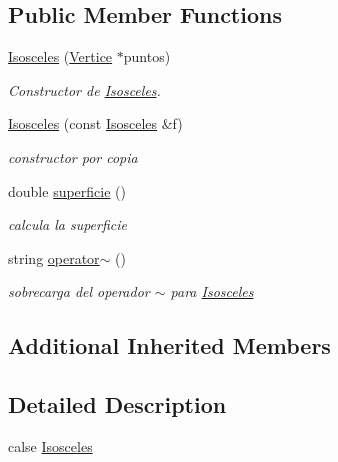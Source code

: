 \subsection*{Public Member Functions}
\begin{DoxyCompactItemize}
\item 
\hyperlink{class_isosceles_a5dc812e7ac02a71016cdc2175176608a}{Isosceles} (\hyperlink{class_vertice}{Vertice} $\ast$puntos)
\begin{DoxyCompactList}\small\item\em Constructor de \hyperlink{class_isosceles}{Isosceles}. \end{DoxyCompactList}\item 
\hyperlink{class_isosceles_a7190cc477e9835205f3061633f73825f}{Isosceles} (const \hyperlink{class_isosceles}{Isosceles} \&f)
\begin{DoxyCompactList}\small\item\em constructor por copia \end{DoxyCompactList}\item 
\mbox{\label{class_isosceles_aa09c863c5ef3620e9c57b09ee380d3d1}} 
double \hyperlink{class_isosceles_aa09c863c5ef3620e9c57b09ee380d3d1}{superficie} ()
\begin{DoxyCompactList}\small\item\em calcula la superficie \end{DoxyCompactList}\item 
\mbox{\label{class_isosceles_a8998981f4d303e909964dfe90f77f445}} 
string \hyperlink{class_isosceles_a8998981f4d303e909964dfe90f77f445}{operator$\sim$} ()
\begin{DoxyCompactList}\small\item\em sobrecarga del operador $\sim$ para \hyperlink{class_isosceles}{Isosceles} \end{DoxyCompactList}\end{DoxyCompactItemize}
\subsection*{Additional Inherited Members}


\subsection{Detailed Description}
calse \hyperlink{class_isosceles}{Isosceles} 

